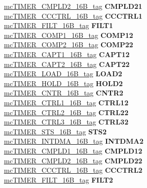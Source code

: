 \begin{DoxyCompactItemize}
\begin{tabbing}
\>\>\mbox{\hyperlink{unionmcTIMER__CMPLD2__16B__tag}{mcTIMER\_CMPLD2\_16B\_tag}} {\bfseries CMPLD21}\\
\>\>\mbox{\hyperlink{unionmcTIMER__CCCTRL__16B__tag}{mcTIMER\_CCCTRL\_16B\_tag}} {\bfseries CCCTRL1}\\
\>\>\mbox{\hyperlink{unionmcTIMER__FILT__16B__tag}{mcTIMER\_FILT\_16B\_tag}} {\bfseries FILT1}\\
\>\>\mbox{\hyperlink{unionmcTIMER__COMP1__16B__tag}{mcTIMER\_COMP1\_16B\_tag}} {\bfseries COMP12}\\
\>\>\mbox{\hyperlink{unionmcTIMER__COMP2__16B__tag}{mcTIMER\_COMP2\_16B\_tag}} {\bfseries COMP22}\\
\>\>\mbox{\hyperlink{unionmcTIMER__CAPT1__16B__tag}{mcTIMER\_CAPT1\_16B\_tag}} {\bfseries CAPT12}\\
\>\>\mbox{\hyperlink{unionmcTIMER__CAPT2__16B__tag}{mcTIMER\_CAPT2\_16B\_tag}} {\bfseries CAPT22}\\
\>\>\mbox{\hyperlink{unionmcTIMER__LOAD__16B__tag}{mcTIMER\_LOAD\_16B\_tag}} {\bfseries LOAD2}\\
\>\>\mbox{\hyperlink{unionmcTIMER__HOLD__16B__tag}{mcTIMER\_HOLD\_16B\_tag}} {\bfseries HOLD2}\\
\>\>\mbox{\hyperlink{unionmcTIMER__CNTR__16B__tag}{mcTIMER\_CNTR\_16B\_tag}} {\bfseries CNTR2}\\
\>\>\mbox{\hyperlink{unionmcTIMER__CTRL1__16B__tag}{mcTIMER\_CTRL1\_16B\_tag}} {\bfseries CTRL12}\\
\>\>\mbox{\hyperlink{unionmcTIMER__CTRL2__16B__tag}{mcTIMER\_CTRL2\_16B\_tag}} {\bfseries CTRL22}\\
\>\>\mbox{\hyperlink{unionmcTIMER__CTRL3__16B__tag}{mcTIMER\_CTRL3\_16B\_tag}} {\bfseries CTRL32}\\
\>\>\mbox{\hyperlink{unionmcTIMER__STS__16B__tag}{mcTIMER\_STS\_16B\_tag}} {\bfseries STS2}\\
\>\>\mbox{\hyperlink{unionmcTIMER__INTDMA__16B__tag}{mcTIMER\_INTDMA\_16B\_tag}} {\bfseries INTDMA2}\\
\>\>\mbox{\hyperlink{unionmcTIMER__CMPLD1__16B__tag}{mcTIMER\_CMPLD1\_16B\_tag}} {\bfseries CMPLD12}\\
\>\>\mbox{\hyperlink{unionmcTIMER__CMPLD2__16B__tag}{mcTIMER\_CMPLD2\_16B\_tag}} {\bfseries CMPLD22}\\
\>\>\mbox{\hyperlink{unionmcTIMER__CCCTRL__16B__tag}{mcTIMER\_CCCTRL\_16B\_tag}} {\bfseries CCCTRL2}\\
\>\>\mbox{\hyperlink{unionmcTIMER__FILT__16B__tag}{mcTIMER\_FILT\_16B\_tag}} {\bfseries FILT2}\\

\end{tabbing}
\end{DoxyCompactItemize}
